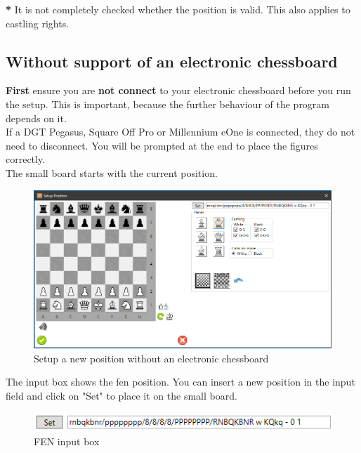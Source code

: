 \documentclass[11pt,a4paper]{article}
\begin{document}
\textbf{{\color{red}*}} It is not completely checked whether the position is valid. This also applies to castling rights.

\subsection{Without support of an electronic chessboard}

\textbf{First} ensure you are \textbf{not connect} to your electronic chessboard before you run the setup. This is important, because the further behaviour of the program depends on it.\\
If a DGT Pegasus, Square Off Pro or Millennium eOne is connected, they do not need to disconnect. You will be prompted at the end to place the figures correctly. \\
The small board starts with the current position.

\begin{figure}[H]
	\centering
	\includegraphics[scale=0.5]{SetupPosition2.png}
	\caption{Setup a new position without an electronic chessboard}
	\label{fig:SetupPosition2}
\end{figure}

The input box shows the fen position. You can insert a new position in the input field and click on "Set" to place it on the small board.

\begin{figure}[H]
	\centering
	\includegraphics[scale=0.55]{SetupPosition3.png}
	\caption{FEN input box}
	\label{fig:SetupPosition3}
\end{figure}
\end{document}
